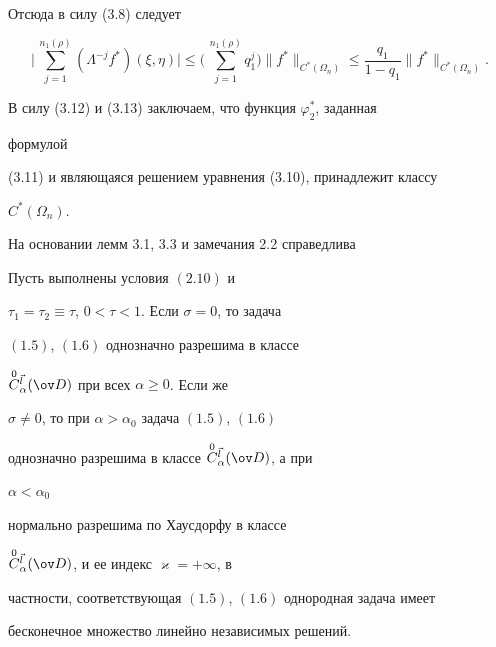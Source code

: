 \begin{pf}
Отсюда в силу (3.8) следует


\begin{equation}


\biggl|\,\sum^{n_1(\rho)}_{j=1}(\Lambda^{-j}f^*)(\xi,\eta)\biggr|


\le\biggl(\,\sum^{n_1(\rho)}_{j=1}q^j_1\biggr)\|f^*\|_{C^*(\Omega_n)}


\le\frac{q_1}{1-q_1}\|f^*\|_{C^*(\Omega_n)}.


\end{equation}





В силу (3.12) и (3.13) заключаем, что функция $\varphi^*_2$, заданная


формулой


(3.11) и являющаяся решением уравнения (3.10), принадлежит классу


$C^*(\Omega_n)$.


\end{pf}





На основании лемм 3.1, 3.3 и замечания 2.2 справедлива





\begin{thmnonum}


Пусть выполнены условия $(2.10)$ и


$\tau_1=\tau_2\equiv\tau$, $0<\tau<1$. Если $\sigma=0$, то задача


$(1.5)$, $(1.6)$ однозначно разрешима в классе


$\OC^{\Vec l}_\alpha(\ov D)$ при всех $\alpha\ge 0$. Если же


$\sigma\ne 0$, то при $\alpha>\alpha_0$ задача $(1.5)$, $(1.6)$


однозначно разрешима в классе $\OC^{\Vec l}_\alpha(\ov D)$, а при


$\alpha<\alpha_0$ 


нормально разрешима по Хаусдорфу в классе


$\OC^{\Vec l}_\alpha(\ov D)$, и ее индекс $\varkappa=+\infty$, в


частности, соответствующая $(1.5)$, $(1.6)$ однородная задача имеет


бесконечное множество линейно независимых решений.


\end{thmnonum}





